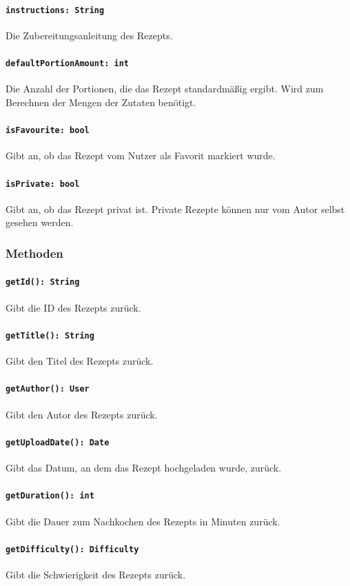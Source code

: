 \documentclass[parskip=full]{scrartcl}
\begin{document}
\paragraph{\texttt{instructions: String}}
Die Zubereitungsanleitung des Rezepts.
\paragraph{\texttt{defaultPortionAmount: int}}
Die Anzahl der Portionen, die das Rezept standardmäßig ergibt. Wird zum Berechnen der Mengen der Zutaten benötigt.
\paragraph{\texttt{isFavourite: bool}}
Gibt an, ob das Rezept vom Nutzer als Favorit markiert wurde.
\paragraph{\texttt{isPrivate: bool}}
Gibt an, ob das Rezept privat ist. Private Rezepte können nur vom Autor selbst gesehen werden.

\subsubsection*{Methoden}
\paragraph{\texttt{getId(): String}}
Gibt die ID des Rezepts zurück.
\paragraph{\texttt{getTitle(): String}}
Gibt den Titel des Rezepts zurück.
\paragraph{\texttt{getAuthor(): User}}
Gibt den Autor des Rezepts zurück.
\paragraph{\texttt{getUploadDate(): Date}}
Gibt das Datum, an dem das Rezept hochgeladen wurde, zurück.
\paragraph{\texttt{getDuration(): int}}
Gibt die Dauer zum Nachkochen des Rezepts in Minuten zurück.
\paragraph{\texttt{getDifficulty(): Difficulty}}
Gibt die Schwierigkeit des Rezepts zurück.
\end{document}
